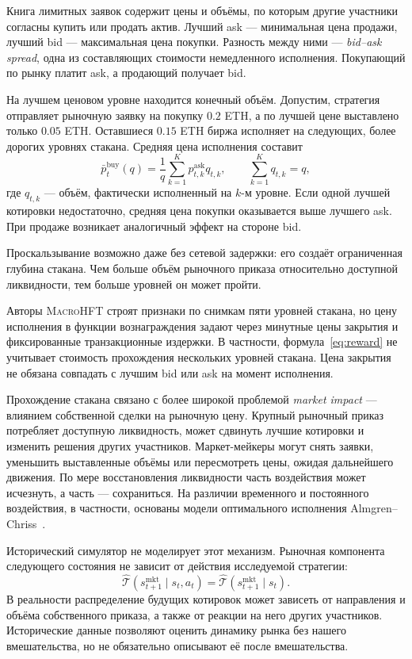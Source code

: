 \documentclass[9pt,a4paper,twocolumn]{extarticle}
\newcommand{\Macro}{\textsc{MacroHFT}}
\begin{document}
Книга лимитных заявок содержит цены и объёмы, по которым другие участники согласны купить или
продать актив. Лучший ask --- минимальная цена продажи, лучший bid --- максимальная цена
покупки. Разность между ними --- \emph{bid--ask spread}, одна из составляющих стоимости
немедленного исполнения. Покупающий по рынку платит ask, а продающий получает bid.

На лучшем ценовом уровне находится конечный объём. Допустим, стратегия отправляет рыночную
заявку на покупку $0.2$ ETH, а по лучшей цене выставлено только $0.05$ ETH. Оставшиеся $0.15$
ETH биржа исполняет на следующих, более дорогих уровнях стакана. Средняя цена исполнения
составит
\begin{equation}
    \bar p_t^{\mathrm{buy}}(q)
    =
    \frac{1}{q}
    \sum_{k=1}^{K}
       p_{t,k}^{\mathrm{ask}}q_{t,k},
    \qquad
    \sum_{k=1}^{K}q_{t,k}=q,
    \label{eq:lob_sweep}
\end{equation}
где $q_{t,k}$ --- объём, фактически исполненный на $k$-м уровне. Если одной лучшей котировки
недостаточно, средняя цена покупки оказывается выше лучшего ask. При продаже возникает
аналогичный эффект на стороне bid.

Проскальзывание возможно даже без сетевой задержки: его создаёт ограниченная глубина стакана.
Чем больше объём рыночного приказа относительно доступной ликвидности, тем больше уровней он
может пройти.

Авторы \Macro{} строят признаки по снимкам пяти уровней стакана, но цену исполнения в функции
вознаграждения задают через минутные цены закрытия и фиксированные транзакционные издержки. В
частности, формула~\eqref{eq:reward} не учитывает стоимость прохождения нескольких уровней
стакана. Цена закрытия не обязана совпадать с лучшим bid или ask на момент исполнения.

Прохождение стакана связано с более широкой проблемой \emph{market impact} --- влиянием
собственной сделки на рыночную цену. Крупный рыночный приказ потребляет доступную ликвидность,
может сдвинуть лучшие котировки и изменить решения других участников. Маркет-мейкеры могут снять
заявки, уменьшить выставленные объёмы или пересмотреть цены, ожидая дальнейшего движения. По
мере восстановления ликвидности часть воздействия может исчезнуть, а часть --- сохраниться. На
различии временного и постоянного воздействия, в частности, основаны модели оптимального
исполнения Almgren--Chriss~\cite{almgren2001optimal}.

Исторический симулятор не моделирует этот механизм. Рыночная компонента следующего состояния не
зависит от действия исследуемой стратегии:
\begin{equation}
    \widehat{\mathcal T}
    (s_{t+1}^{\mathrm{mkt}}\mid s_t,a_t)
    =
    \widehat{\mathcal T}
    (s_{t+1}^{\mathrm{mkt}}\mid s_t).
    \label{eq:exogenous_market}
\end{equation}
В реальности распределение будущих котировок может зависеть от направления и объёма собственного
приказа, а также от реакции на него других участников. Исторические данные позволяют оценить
динамику рынка без нашего вмешательства, но не обязательно описывают её после вмешательства.
\end{document}
